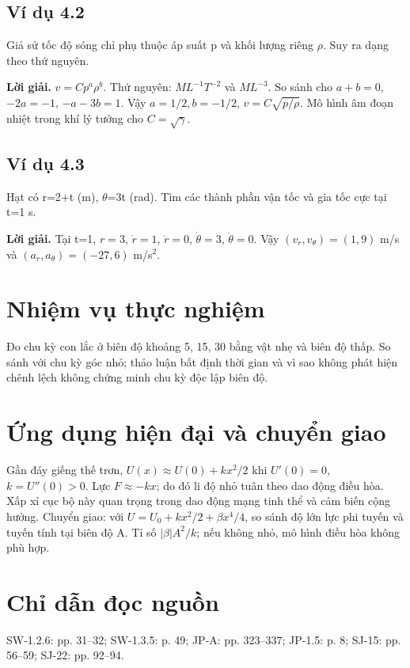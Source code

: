 \documentclass[11pt,a4paper,openany]{book}
\begin{document}
\subsection*{Ví dụ 4.2}
Giả sử tốc độ sóng chỉ phụ thuộc áp suất p và khối lượng riêng \ensuremath{\rho}. Suy ra dạng theo thứ nguyên.

\textbf{Lời giải.} $v=Cp^a\rho^b$. Thứ nguyên: $ML^{-1}T^{-2}$ và $ML^{-3}$. So sánh cho $a+b=0$, $-2a=-1$, $-a-3b=1$. Vậy $a=1/2,b=-1/2$, $v=C\sqrt{p/\rho}$. Mô hình âm đoạn nhiệt trong khí lý tưởng cho $C=\sqrt\gamma$.
\subsection*{Ví dụ 4.3}
Hạt có r=2+t (m), \ensuremath{\theta}=3t (rad). Tìm các thành phần vận tốc và gia tốc cực tại t=1 s.

\textbf{Lời giải.} Tại t=1, $r=3$, $\dot r=1$, $\ddot r=0$, $\dot\theta=3$, $\ddot\theta=0$. Vậy $(v_r,v_\theta)=(1,9)$ m/s và $(a_r,a_\theta)=(-27,6)$ m/s$^2$.
\section{Nhiệm vụ thực nghiệm}
Đo chu kỳ con lắc ở biên độ khoảng 5\textdegree{}, 15\textdegree{}, 30\textdegree{} bằng vật nhẹ và biên độ thấp. So sánh với chu kỳ góc nhỏ; thảo luận bất định thời gian và vì sao không phát hiện chênh lệch không chứng minh chu kỳ độc lập biên độ.
\section{Ứng dụng hiện đại và chuyển giao}
Gần đáy giếng thế trơn, $U(x)\approx U(0)+kx^2/2$ khi $U'(0)=0$, $k=U''(0)>0$. Lực $F\approx-kx$; do đó li độ nhỏ tuân theo dao động điều hòa. Xấp xỉ cục bộ này quan trọng trong dao động mạng tinh thể và cảm biến cộng hưởng. Chuyển giao: với $U=U_0+kx^2/2+\beta x^4/4$, so sánh độ lớn lực phi tuyến và tuyến tính tại biên độ A. Tỉ số $|\beta|A^2/k$; nếu không nhỏ, mô hình điều hòa không phù hợp.
\section{Chỉ dẫn đọc nguồn}
SW-1.2.6: pp. 31–32; SW-1.3.5: p. 49; JP-A: pp. 323–337; JP-1.5: p. 8; SJ-15: pp. 56–59; SJ-22: pp. 92–94.
\end{document}
